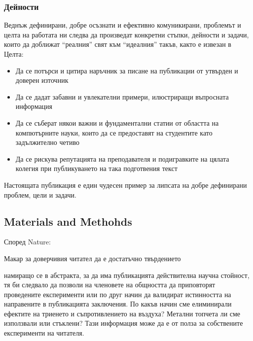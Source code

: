 \documentclass[11pt, oneside]{article}     %
\begin{document}
  \subsubsection*{Дейности}
  Веднъж дефинирани, добре осъзнати и ефективно комуникирани, проблемът и целта на работата ни следва да произведат конкретни стъпки, дейности и задачи, които да доближат ``реалния'' свят към ``идеалния'' такъв, както е извезан в Целта:
  \begin{itemize}
    \item Да се потърси и цитира наръчник за писане на публикации от утвърден и доверен източник
    \item Да се дадат забавни и увлекателни примери, илюстриращи въпросната информация
    \item Да се съберат някои важни и фундаментални статии от областта на компютърните науки, които да се предоставят на студентите като задължително четиво
    \item Да се рискува репутацията на преподавателя и подигравките на цялата колегия при публикуването на така подготвения текст
  \end{itemize}

  Настоящата публикация е един чудесен пример за липсата на добре дефинирани проблем, цели и задачи.


\subsection*{Materials and Methohds}

Според Nature:\\

Макар за доверчивия читател да е достатъчно твърдението \\

  намиращо се в абстракта, за да има публикацията действителна научна стойност, тя би следвало да позволи на членовете на общността да приповторят проведените експерименти или по друг начин да валидират истинността на направените в публикацията заключения. По какъв начин сме елиминирали ефектите на триенето и съпротивлението на въздуха? Метални топчета ли сме използвали или стъклени? Тази информация може да е от полза за собствените експерименти на читателя. 
\end{document}
